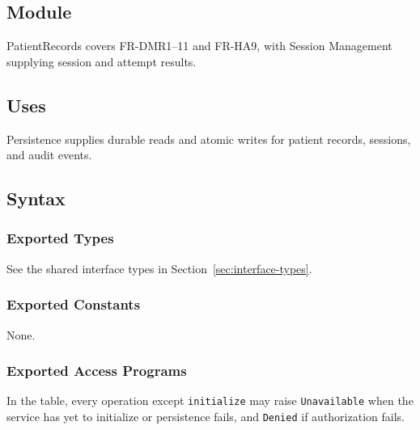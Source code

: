 \documentclass[12pt, titlepage]{article}
\begin{document}
\subsection{Module}
PatientRecords covers FR-DMR1--11 and FR-HA9, with Session Management supplying
session and attempt results.

\subsection{Uses}
Persistence supplies durable reads and atomic writes for patient records, sessions, and audit events.

\subsection{Syntax}

\subsubsection{Exported Types}
See the shared interface types in Section~\ref{sec:interface-types}.

\subsubsection{Exported Constants}
None.

\subsubsection{Exported Access Programs}
In the table, every operation except \texttt{initialize} may raise
\texttt{Unavailable} when the service has yet to initialize or persistence
fails, and \texttt{Denied} if authorization fails.
\end{document}
